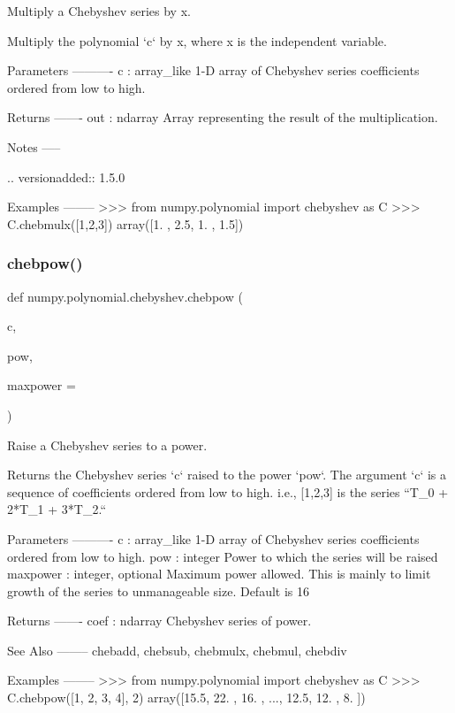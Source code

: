 \begin{DoxyVerb}Multiply a Chebyshev series by x.

Multiply the polynomial `c` by x, where x is the independent
variable.


Parameters
----------
c : array_like
    1-D array of Chebyshev series coefficients ordered from low to
    high.

Returns
-------
out : ndarray
    Array representing the result of the multiplication.

Notes
-----

.. versionadded:: 1.5.0

Examples
--------
>>> from numpy.polynomial import chebyshev as C
>>> C.chebmulx([1,2,3])
array([1. , 2.5, 1. , 1.5])\end{DoxyVerb}
 \mbox{\label{namespacenumpy_1_1polynomial_1_1chebyshev_ae3af64bbb5a7e893626292b6cc193ae9}} 
\subsubsection{\texorpdfstring{chebpow()}{chebpow()}}
{\footnotesize\ttfamily def numpy.\+polynomial.\+chebyshev.\+chebpow (\begin{DoxyParamCaption}\item[{}]{c,  }\item[{}]{pow,  }\item[{}]{maxpower = {} }\end{DoxyParamCaption})}

\begin{DoxyVerb}Raise a Chebyshev series to a power.

Returns the Chebyshev series `c` raised to the power `pow`. The
argument `c` is a sequence of coefficients ordered from low to high.
i.e., [1,2,3] is the series  ``T_0 + 2*T_1 + 3*T_2.``

Parameters
----------
c : array_like
    1-D array of Chebyshev series coefficients ordered from low to
    high.
pow : integer
    Power to which the series will be raised
maxpower : integer, optional
    Maximum power allowed. This is mainly to limit growth of the series
    to unmanageable size. Default is 16

Returns
-------
coef : ndarray
    Chebyshev series of power.

See Also
--------
chebadd, chebsub, chebmulx, chebmul, chebdiv

Examples
--------
>>> from numpy.polynomial import chebyshev as C
>>> C.chebpow([1, 2, 3, 4], 2)
array([15.5, 22. , 16. , ..., 12.5, 12. ,  8. ])\end{DoxyVerb}
 \mbox{\label{namespacenumpy_1_1polynomial_1_1chebyshev_ae301bf9cbe60a1e030d755e972831fcb}} 

